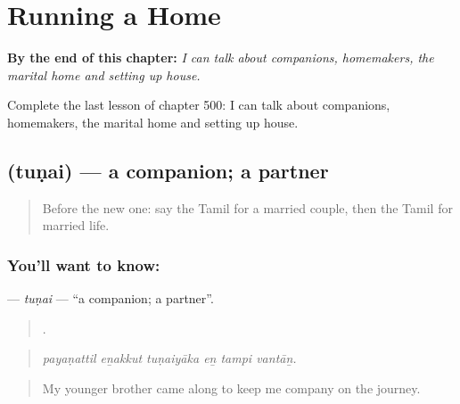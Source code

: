 
\chapter{Running a Home}
\label{ch:ta-running-a-home}

\begin{chapteropening}
\textbf{By the end of this chapter:} \emph{I can talk about companions, homemakers, the marital home and setting up house.}

Complete the last lesson of chapter 500: I can talk about companions, homemakers, the marital home and setting up house.
\end{chapteropening}

\section[\texorpdfstring{\ta{துணை} (tuṇai)}{துணை (tuṇai)}]{ (tuṇai) — a companion; a partner}

\label{lesson:TA-C500-tunai}



\begin{quote}
Before the new one: say the Tamil for a married couple, then the Tamil for married life.
\end{quote}

\subsection*{You'll want to know: }
\textbf{} — \emph{tuṇai} — \textquotedblleft{}a companion; a partner\textquotedblright{}.

\begin{quote}
     .
\end{quote}

\begin{quote}
\emph{payaṇattil eṉakkut tuṇaiyāka eṉ tampi vantāṉ.}
\end{quote}

\begin{quote}
My younger brother came along to keep me company on the journey.
\end{quote}


